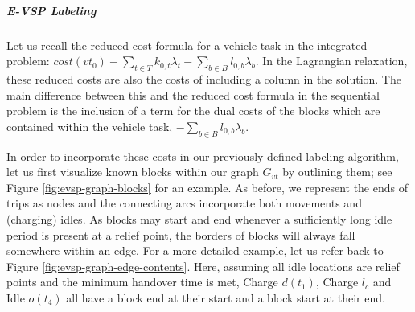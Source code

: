 \documentclass[]{article}
\begin{document}
\subparagraph{E-VSP Labeling} Let us recall the reduced cost formula for a vehicle task in the integrated problem: $cost(vt_0) - \sum_{t \in T}k_{0,t} \lambda_t - \sum_{b \in B}l_{0,b}\lambda_b$. In the Lagrangian relaxation, these reduced costs are also the costs of including a column in the solution. The main difference between this and the reduced cost formula in the sequential problem is the inclusion of a term for the dual costs of the blocks which are contained within the vehicle task, $-\sum_{b \in B}l_{0,b}\lambda_b$.

In order to incorporate these costs in our previously defined labeling algorithm, let us first visualize known blocks within our graph $G_{vt}$ by outlining them; see Figure \ref{fig:evsp-graph-blocks} for an example. As before, we represent the ends of trips as nodes and the connecting arcs incorporate both movements and (charging) idles. As blocks may start and end whenever a sufficiently long idle period is present at a relief point, the borders of blocks will always fall somewhere within an edge. For a more detailed example, let us refer back to Figure \ref{fig:evsp-graph-edge-contents}. Here, assuming all idle locations are relief points and the minimum handover time is met, Charge $d(t_1)$, Charge $l_c$ and Idle $o(t_4)$ all have a block end at their start and a block start at their end.
\end{document}
